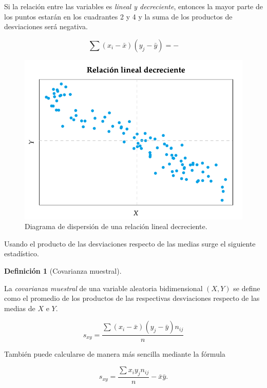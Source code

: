 \documentclass[
  a4paper,
]{scrreport}
\theoremstyle{plain}
\theoremstyle{definition}
\newtheorem{definition}{Definición}[chapter]
\theoremstyle{definition}
\theoremstyle{remark}
\begin{document}
Si la relación entre las variables es \emph{lineal y decreciente},
entonces la mayor parte de los puntos estarán en los cuadrantes 2 y 4 y
la suma de los productos de desviaciones será negativa.

\[\sum(x_i-\bar x)(y_j-\bar y) = -\]

\begin{figure}[H]

{\centering \includegraphics{img/regresion/diagrama_dispersion_lineal_decreciente.pdf}

}

\caption{Diagrama de dispersión de una relación lineal decreciente.}

\end{figure}%

Usando el producto de las desviaciones respecto de las medias surge el
siguiente estadístico.

\begin{definition}[Covarianza
muestral]\protect\hypertarget{def-covarianza}{}\label{def-covarianza}

La \emph{covarianza muestral} de una variable aleatoria bidimensional
\((X,Y)\) se define como el promedio de los productos de las respectivas
desviaciones respecto de las medias de \(X\) e \(Y\).

\[s_{xy}=\frac{\sum (x_i-\bar x)(y_j-\bar y)n_{ij}}{n}\]

\end{definition}

También puede calcularse de manera más sencilla mediante la fórmula

\[s_{xy}=\frac{\sum x_iy_jn_{ij}}{n}-\bar x\bar y.\]
\end{document}
